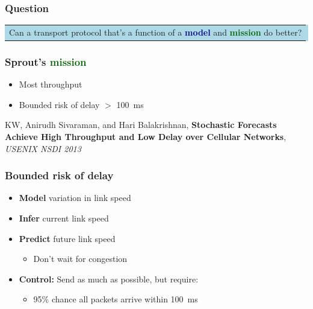 \documentclass[svgnames]{beamer}
\begin{document}
\begin{frame}
\frametitle{Question}

\begin{centering}
\colorbox{LightBlue}{
\begin{tabular}{p{4 in}}
\LARGE Can a transport protocol that's a function of
a \textbf{\textcolor{DarkBlue}{model}} and
\textbf{\textcolor{DarkGreen}{mission}} do better?
\end{tabular}}

\end{centering}

\end{frame}

\begin{frame}
\frametitle{Sprout's \textcolor{DarkGreen}{\bf mission}}

\Large

\begin{itemize}
\item Most throughput
\item Bounded risk of delay $>$ 100~ms
\end{itemize}

\vspace{\baselineskip}
\vspace{\baselineskip}
\vspace{\baselineskip}

\scriptsize

KW, Anirudh Sivaraman, and Hari Balakrishnan, \textbf{Stochastic Forecasts Achieve High Throughput and Low Delay over Cellular Networks}, \textit{USENIX NSDI 2013}

\end{frame}

\begin{frame}
\frametitle{Bounded risk of delay}
\begin{itemize}

\large

\item \textbf{Model} variation in link speed

\item \textbf{Infer} current link speed

\item \textbf{Predict} future link speed

\begin{itemize}
\item Don't wait for congestion
\end{itemize}

\item \textbf{Control:} Send as much as possible, but require:

\begin{itemize}

\item 95\% chance all packets arrive within 100~ms

\end{itemize}

\end{itemize}

\end{frame}
\end{document}
